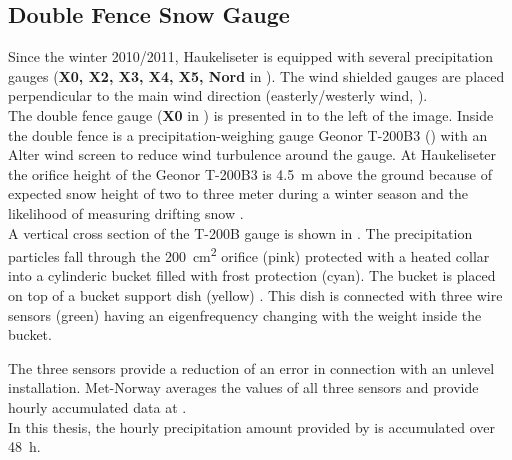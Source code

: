 \subsection{Double Fence Snow Gauge}\label{sec:dofe}
Since the winter 2010/2011, Haukeliseter is equipped with several precipitation gauges (\textbf{X0, X2, X3, X4, X5, Nord} in ). The wind shielded gauges are placed perpendicular to the main wind direction (easterly/westerly wind, ).
\\
The double fence gauge (\textbf{X0} in ) is presented in  to the left of the image.
Inside the double fence is a precipitation-weighing gauge Geonor T-200B3 \citep[3-wire transducers, \SI{1000}{\mm},][]{geonor_inc._t-200b_2015} () with an Alter wind screen to reduce wind turbulence around the gauge. At Haukeliseter the orifice height of the Geonor T-200B3 is \SI{4.5}{\metre} above the ground because of expected snow height of two to three meter during a winter season and the likelihood of measuring drifting snow \citep{wolff_measurements_2013,wolff_derivation_2015}. 
\\
A vertical cross section of the T-200B gauge is shown in . The precipitation particles fall through the \SI{200}{\square\cm} orifice (pink) protected with a heated collar into a cylinderic bucket filled with frost protection (cyan). The bucket is placed on top of a bucket support dish (yellow) \citep[,][]{geonor_inc._t-200b_2015}. This dish is connected with three wire sensors (green) having an eigenfrequency changing with the weight inside the bucket. %

\noindent
The three sensors provide a reduction of an error in connection with an unlevel installation. Met-Norway averages the values of all three sensors and provide hourly accumulated data at \citeauthor{eklima_norwegian_2016}. 
\\
In this thesis, the hourly precipitation amount provided by \citeauthor{eklima_norwegian_2016} is accumulated over \SI{48}{\hour}.
\\
\\
